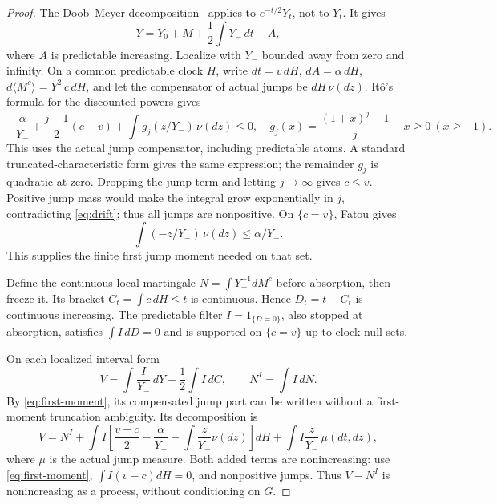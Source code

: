 \documentclass[11pt]{article}
\theoremstyle{definition}
\theoremstyle{remark}
\begin{document}
\begin{proof}
The Doob--Meyer decomposition~\cite[Theorem~I.3.15]{JS} applies to $e^{-t/2}Y_t$, not to $Y_t$. It gives
\[
 Y=Y_0+M+\frac12\int Y_-\,dt-A,
\]
where $A$ is predictable increasing. Localize with $Y_-$ bounded away from zero and infinity. On a common predictable clock $H$, write $dt=v\,dH$, $dA=\alpha\,dH$, $d\langle M^c\rangle=Y_-^2c\,dH$, and let the compensator of actual jumps be $dH\,\nu(dz)$. It\^o's formula for the discounted powers gives
\begin{equation}\label{eq:drift}
 -\frac\alpha{Y_-}+\frac{j-1}{2}(c-v)
 +\int g_j(z/Y_-)\,\nu(dz)\le0,
 \quad g_j(x)=\frac{(1+x)^j-1}{j}-x\ge0\ (x\ge-1).
\end{equation}
This uses the actual jump compensator, including predictable atoms. A standard truncated-characteristic form gives the same expression; the remainder $g_j$ is quadratic at zero. Dropping the jump term and letting $j\to\infty$ gives $c\le v$. Positive jump mass would make the integral grow exponentially in $j$, contradicting \eqref{eq:drift}; thus all jumps are nonpositive. On $\{c=v\}$, Fatou gives
\begin{equation}\label{eq:first-moment}
 \int(-z/Y_-)\,\nu(dz)\le\alpha/Y_-.
\end{equation}
This supplies the finite first jump moment needed on that set.

Define the continuous local martingale $N=\int Y_-^{-1}dM^c$ before absorption, then freeze it. Its bracket $C_t=\int c\,dH\le t$ is continuous. Hence $D_t=t-C_t$ is continuous increasing. The predictable filter $I=1_{\{D=0\}}$, also stopped at absorption, satisfies $\int I\,dD=0$ and is supported on $\{c=v\}$ up to clock-null sets.

On each localized interval form
\[
 V=\int\frac I{Y_-}\,dY-\frac12\int I\,dC,
 \qquad N^I=\int I\,dN.
\]
By \eqref{eq:first-moment}, its compensated jump part can be written without a first-moment truncation ambiguity. Its decomposition is
\[
 V=N^I+\int I\left[\frac{v-c}{2}-\frac\alpha{Y_-}
             -\int\frac z{Y_-}\nu(dz)\right]dH
       +\int I\frac z{Y_-}\,\mu(dt,dz),
\]
where $\mu$ is the actual jump measure. Both added terms are nonincreasing: use \eqref{eq:first-moment}, $\int I(v-c)dH=0$, and nonpositive jumps. Thus $V-N^I$ is nonincreasing as a process, without conditioning on $G$.


\end{proof}
\end{document}
